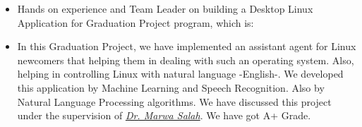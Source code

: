 \documentclass[10pt,a4paper]{altacv}
\begin{document}

%
\begin{fullwidth}
\makecvheader
\end{fullwidth}





\begin{itemize}
\item Hands on experience and Team Leader on building a Desktop Linux Application for Graduation Project program, which is:
\end{itemize}

\begin{mdframed}

\begin{itemize}
  \item \small{In this Graduation Project, we have implemented an assistant agent for Linux newcomers that helping them in dealing with such an operating system. Also, helping in controlling Linux with natural language -English-. We developed this application by Machine Learning and Speech Recognition. Also by Natural Language Processing algorithms. We have discussed this project under the supervision of  \href{http://fcih.helwan.edu.eg/index.php/en/is-department/faculty-members-is/35-dr-marwa-salah}{\textit{Dr. Marwa Salah}}. We have got A+ Grade.}

\end{itemize}
\end{mdframed}
\end{document}
